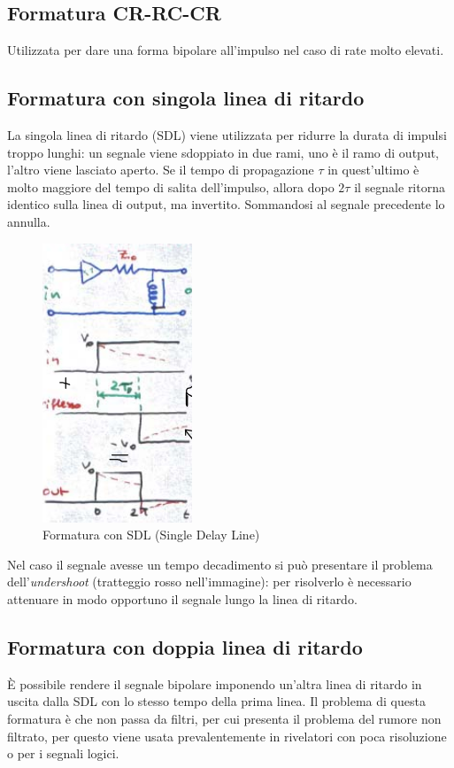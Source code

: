 \subsection{Formatura CR-RC-CR}
Utilizzata per dare una forma bipolare all'impulso nel caso di rate molto elevati.
\subsection{Formatura con singola linea di ritardo}
La singola linea di ritardo (SDL) viene utilizzata per ridurre la durata di impulsi troppo lunghi:
un segnale viene sdoppiato in due rami, uno \`e il ramo di output, l'altro viene lasciato aperto.
Se il tempo di propagazione $\tau$ in quest'ultimo \`e molto maggiore del tempo di salita dell'impulso, allora dopo $2 \tau$ il segnale ritorna identico sulla linea di output, 
ma invertito.
Sommandosi al segnale precedente lo annulla.
\begin{figure}[htbp]
\begin{center}
	\includegraphics[scale=1]{./Immagini/SDL.png}
	\caption{Formatura con SDL (Single Delay Line)}
\label{fig:SDL}
\end{center}
\end{figure}
Nel caso il segnale avesse un tempo decadimento si pu\`o presentare il problema dell'\textit{undershoot} (tratteggio rosso nell'immagine): per risolverlo
\`e necessario attenuare in modo opportuno il segnale lungo la linea di ritardo.
\subsection{Formatura con doppia linea di ritardo}
\`E possibile rendere il segnale bipolare imponendo un'altra linea di ritardo in uscita dalla SDL con lo stesso tempo della prima linea.
Il problema di questa formatura \`e che non passa da filtri, per cui presenta il problema del rumore non filtrato, per questo viene usata prevalentemente
in rivelatori con poca risoluzione o per i segnali logici.
